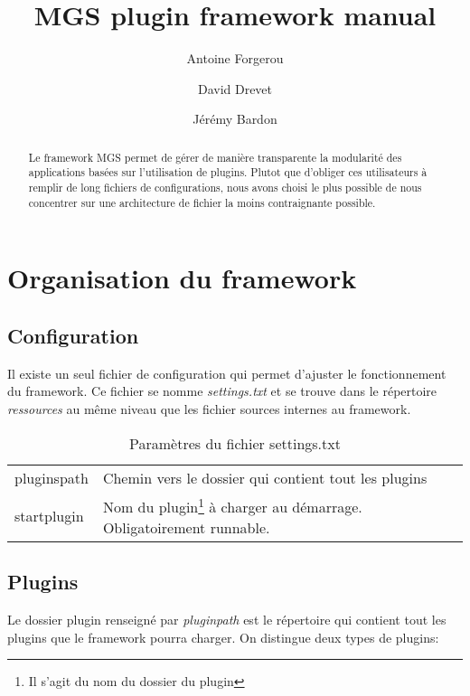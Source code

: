 \documentclass[12pt,a4paper]{article}
\title{MGS plugin framework manual}
\author{Antoine Forgerou \and David Drevet \and Jérémy Bardon}
\date{}
\begin{document}
	\renewcommand{\contentsname}{Sommaire}
	\renewcommand{\arraystretch}{1.8}
	\maketitle	
	
	\vspace{0.80cm}
	\tableofcontents	

	\thispagestyle{empty}	
	\setcounter{page}{0}
	\newpage
	
\begin{abstract}
Le framework MGS permet de gérer de manière transparente la modularité des 
applications basées sur l'utilisation de plugins. Plutot que d'obliger ces 
utilisateurs à remplir de long fichiers de configurations, nous avons choisi 
le plus possible de nous concentrer sur une architecture de fichier la moins
contraignante possible.
\end{abstract}

\section{Organisation du framework}
\subsection{Configuration}
Il existe un seul fichier de configuration qui permet d'ajuster le fonctionnement 
du framework. Ce fichier se nomme \emph{settings.txt} et se trouve dans le 
répertoire \emph{ressources} au même niveau que les fichier sources internes au 
framework.

\begin{table}[h]
\centering
	\begin{tabular}{lp{9cm}}
		pluginspath & Chemin vers le dossier qui contient tout les plugins\\
					 
		startplugin & Nom du plugin\footnote{Il s'agit du nom du dossier du 
		plugin} à charger au démarrage. Obligatoirement runnable.\\					 
	\end{tabular}	
\caption{Paramètres du fichier settings.txt}
\end{table}
	
\subsection{Plugins}
Le dossier plugin renseigné par \emph{pluginpath} est le répertoire qui contient 
tout les plugins que le framework pourra charger. On distingue deux types de 
plugins:
\end{document}
